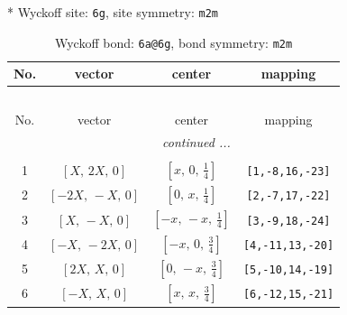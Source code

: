 \documentclass[fleqn,8pt]{jsarticle}
\begin{document}
* Wyckoff site: {\tt 6g}, site symmetry: {\tt m2m}
\renewcommand{\arraystretch}{1.2}
\begin{longtable}{cccc}
\caption{Wyckoff bond: {\tt 6a@6g}, bond symmetry: {\tt m2m}}
 \\
 \hline \hline
No. & vector & center & mapping \\ \hline \endfirsthead

\multicolumn{3}{l}{\tablename\ \thetable{}} \\
 \hline \hline
No. & vector & center & mapping \\ \hline \endhead

 \hline \hline
\multicolumn{3}{r}{\footnotesize\it continued ...} \\ \endfoot

 \hline \hline
\multicolumn{3}{r}{} \\ \endlastfoot

1 & $\left[ X,\, 2 X,\, 0 \right]$ & $\left[ x,\, 0,\, \frac{1}{4} \right]$ & {\tt [1,-8,16,-23]} \\ \hline
2 & $\left[ - 2 X,\, - X,\, 0 \right]$ & $\left[ 0,\, x,\, \frac{1}{4} \right]$ & {\tt [2,-7,17,-22]} \\ \hline
3 & $\left[ X,\, - X,\, 0 \right]$ & $\left[ - x,\, - x,\, \frac{1}{4} \right]$ & {\tt [3,-9,18,-24]} \\ \hline
4 & $\left[ - X,\, - 2 X,\, 0 \right]$ & $\left[ - x,\, 0,\, \frac{3}{4} \right]$ & {\tt [4,-11,13,-20]} \\ \hline
5 & $\left[ 2 X,\, X,\, 0 \right]$ & $\left[ 0,\, - x,\, \frac{3}{4} \right]$ & {\tt [5,-10,14,-19]} \\ \hline
6 & $\left[ - X,\, X,\, 0 \right]$ & $\left[ x,\, x,\, \frac{3}{4} \right]$ & {\tt [6,-12,15,-21]} \\
\end{longtable}
\renewcommand{\arraystretch}{1.2}
\end{document}
